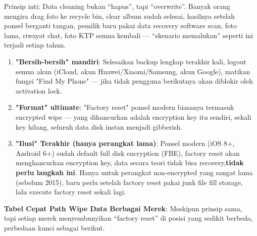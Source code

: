 


Prinsip inti: Data cleaning bukan “hapus”, tapi “overwrite”. Banyak orang mengira drag foto ke recycle bin, clear album sudah selesai, hasilnya setelah ponsel berganti tangan, pemilik baru pakai data recovery software scan, foto lama, riwayat chat, foto KTP semua kembali — “skenario memalukan” seperti ini terjadi setiap tahun.

\begin{enumerate}
  \item \textbf{"Bersih-bersih" mandiri}: Selesaikan backup lengkap terakhir kali, logout semua akun (iCloud, akun Huawei/Xiaomi/Samsung, akun Google), matikan fungsi "Find My Phone" — jika tidak pengguna berikutnya akan diblokir oleh activation lock.
  \item \textbf{"Format" ultimate}: "Factory reset" ponsel modern biasanya termasuk encrypted wipe — yang dihancurkan adalah encryption key itu sendiri, sekali key hilang, seluruh data disk instan menjadi gibberish.
  \item \textbf{"Ilusi" Terakhir (hanya perangkat lama)}: Ponsel modern (iOS 8+, Android 6+) sudah default full disk encryption (FBE), factory reset akan menghancurkan encryption key, data secara teori tidak bisa recovery,\textbf{tidak perlu langkah ini}. Hanya untuk perangkat non-encrypted yang sangat lama (sebelum 2015), baru perlu setelah factory reset pakai junk file fill storage, lalu execute factory reset sekali lagi.
\end{enumerate}

\textbf{Tabel Cepat Path Wipe Data Berbagai Merek}: Meskipun prinsip sama, tapi setiap merek menyembunyikan “factory reset” di posisi yang sedikit berbeda, perbedaan kunci sebagai berikut.

